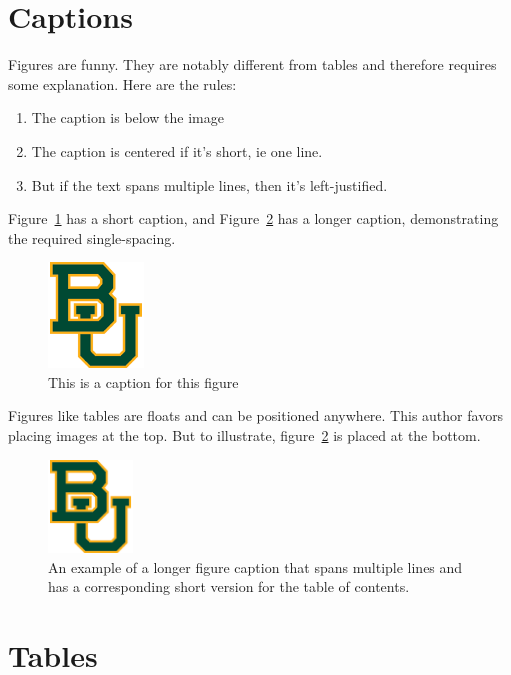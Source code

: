 \section{Captions}
Figures are funny. They are notably different from tables and therefore requires some explanation. Here are the rules:
\begin{enumerate}
\item The caption is below the image
\item The caption is centered if it's short, ie one line. 
\item But if the text spans multiple lines, then it's left-justified. 
\end{enumerate}

Figure~\ref{figure_example1} has a short caption, and
Figure~\ref{figure_example2} has a longer caption, demonstrating the required
single-spacing.

\begin{figure}[ht]
\centering
\includegraphics[width=1in]{baylor}
\caption{This is a caption for this figure}
\label{figure_example1}
\end{figure}

Figures like tables are floats and can be positioned anywhere. 
This author favors placing images at the top. 
But to illustrate, figure~\ref{figure_example2} is placed at the bottom. 

\begin{figure}[b]
\centering
\includegraphics[width=0.2\textwidth]{baylor}
\caption[The short table of contents version]{An example of a longer figure
caption that spans multiple lines and has a corresponding short version for the
table of contents.}
\label{figure_example2}
\end{figure}

\section{Tables}

